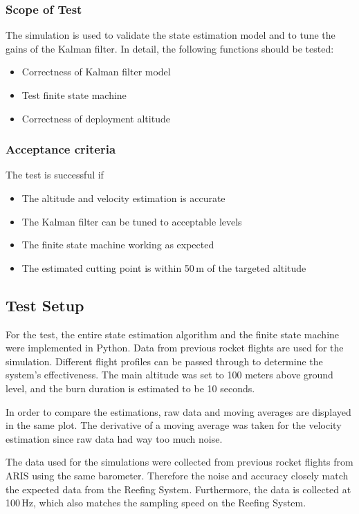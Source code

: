 \subsubsection{Scope of Test}
The simulation is used to validate the state estimation model and to tune the gains of the Kalman filter. In detail, the following functions should be tested:
\begin{itemize}
    \item Correctness of Kalman filter model
    \item Test finite state machine 
    \item Correctness of deployment altitude
\end{itemize}

\subsubsection{Acceptance criteria}
The test is successful if
\begin{itemize}
    \item The altitude and velocity estimation is accurate
    \item The Kalman filter can be tuned to acceptable levels
    \item The finite state machine working as expected
    \item The estimated cutting point is within 50\,m of the targeted altitude
\end{itemize}

\subsection{Test Setup}
For the test, the entire state estimation algorithm and the finite state machine were implemented in Python. Data from previous rocket flights are used for the simulation. Different flight profiles can be passed through to determine the system's effectiveness. The main altitude was set to 100 meters above ground level, and the burn duration is estimated to be 10 seconds.


In order to compare the estimations, raw data and moving averages are displayed in the same plot. The derivative of a moving average was taken for the velocity estimation since raw data had way too much noise.

The data used for the simulations were collected from previous rocket flights from ARIS using the same barometer. Therefore the noise and accuracy closely match the expected data from the Reefing System. Furthermore, the data is collected at 100\,Hz, which also matches the sampling speed on the Reefing System.  

